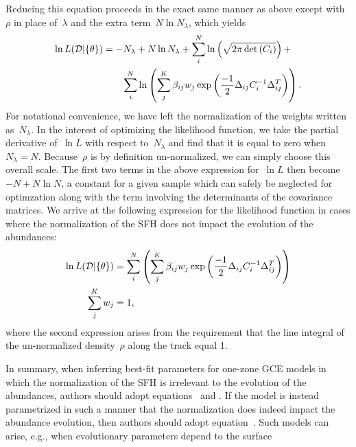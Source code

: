 \documentclass[ms.tex]{subfiles}
\begin{document}
Reducing this equation proceeds in the exact same manner as above except with
$\rho$ in place of~$\lambda$ and the extra term~$N \ln N_\lambda$, which
yields
\begin{equation}\begin{split}
\ln L(\mathcal{D} | \{\theta\}) &= -N_\lambda + N \ln N_\lambda +
\sum_i^N \ln \left(\sqrt{2\pi \det{(C_i)}}\right) +
\\
&\qquad \sum_i^N \ln \left(
\sum_j^K \beta_{ij} w_j
\exp\left(\frac{-1}{2}\Delta_{ij} C_i^{-1} \Delta_{ij}^T\right)\right).
\end{split}\end{equation}
For notational convenience, we have left the normalization of the weights
written as~$N_\lambda$.
In the interest of optimizing the likelihood function, we take the partial
derivative of~$\ln L$ with respect to~$N_\lambda$ and find that it is equal to
zero when~$N_\lambda = N$.
Because~$\rho$ is by definition un-normalized, we can simply choose this
overall scale.
The first two terms in the above expression for~$\ln L$ then become
$-N + N \ln N$, a constant for a given sample which can safely be neglected
for optimzation along with the term involving the determinants of the
covariance matrices.
We arrive at the following expression for the likelihood function in cases
where the normalization of the SFH does not impact the evolution of the
abundances:
\begin{subequations}\begin{align}
\ln L(\mathcal{D} | \{\theta\}) &= \sum_i^N \left( \sum_j^K \beta_{ij} w_j
\exp\left(\frac{-1}{2}\Delta_{ij} C_i^{-1} \Delta_{ij}^T\right) \right)
\label{eq:lnL_fracweight}
\\
\sum_j^K w_j &= 1,
\label{eq:lnL_fracweightsum}
\end{align}\end{subequations}
where the second expression arises from the requirement that the line integral
of the un-normalized density~$\rho$ along the track equal 1.
\par
In summary, when inferring best-fit parameters for one-zone GCE models in which
the normalization of the SFH is irrelevant to the evolution of the abundances,
authors should adopt equations~ and
.
If the model is instead parametrized in such a manner that the normalization
does indeed impact the abundance evolution, then authors should adopt
equation~.
Such models can arise, e.g., when evolutionary parameters depend to the surface
\end{document}
